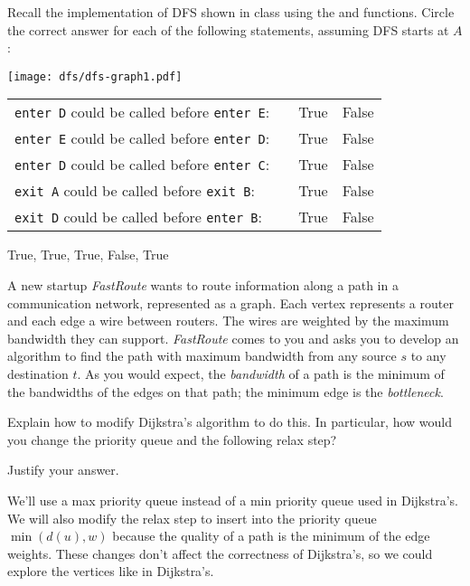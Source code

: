 %
\begin{problem}

Recall the implementation of DFS shown in class using the 
and  functions. Circle the correct answer for each of the
following statements, assuming DFS starts at $A$:

\begin{center}
  \texttt{[image: dfs/dfs-graph1.pdf]}
\end{center}

\bigskip
  \begin{tabular}{lp{1.3in}cc}
    \texttt{enter D} could be called before \texttt{enter E}:& &
    \textsf{True} & \textsf{False}\\[1.5 ex]
    \texttt{enter E} could be called before \texttt{enter D}:& & \textsf{True} & \textsf{False}\\[1.5 ex]
    \texttt{enter D} could be called before \texttt{enter C}:& & \textsf{True} & \textsf{False}\\[1.5 ex]
    \texttt{exit A} could be called before \texttt{exit B}: & & \textsf{True} & \textsf{False}\\[1.5 ex]
    \texttt{exit D} could be called before \texttt{enter B}:&  & \textsf{True} & \textsf{False}
  \end{tabular}

\sol
    True, True, True, False, True
\end{problem}

%

\begin{problem}[5p]

A new startup \emph{FastRoute} wants to route information along a path
in a communication network, represented as a graph. Each vertex
represents a router and each edge a wire between routers. The wires
are weighted by the maximum bandwidth they can
support. \emph{FastRoute} comes to you and asks you to develop an
algorithm to find the path with maximum bandwidth from any source $s$
to any destination $t$. As you would expect, the \emph{bandwidth} of a
path is the minimum of the bandwidths of the edges on that path; the
minimum edge is the \emph{bottleneck}.

\ask
Explain how to modify Dijkstra's algorithm to do this. In particular, how would
you change the priority queue and the following relax step?

\begin{quote}
\end{quote}

Justify your answer.

\sol
  We'll use a max priority queue instead of a min priority queue used
  in Dijkstra's. We will also modify the relax step to insert into the
  priority queue $\min(d(u), w)$ because the quality of a path is the
  minimum of the edge weights. These changes don't affect the
  correctness of Dijkstra's, so we could explore the vertices like in
  Dijkstra's.
\end{problem}


